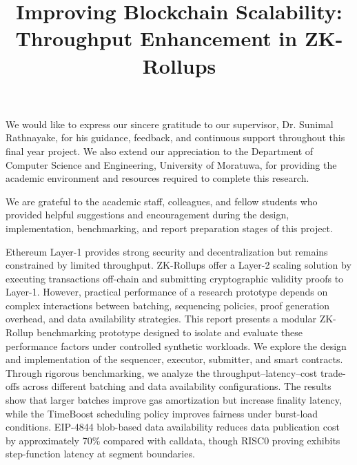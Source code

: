 \documentclass[12pt]{uomthesis}
\begin{document}
\title{Improving Blockchain Scalability: Throughput Enhancement in ZK-Rollups}

\maketitle

We would like to express our sincere gratitude to our supervisor, Dr. Sunimal Rathnayake, for his guidance, feedback, and continuous support throughout this final year project. We also extend our appreciation to the Department of Computer Science and Engineering, University of Moratuwa, for providing the academic environment and resources required to complete this research.

We are grateful to the academic staff, colleagues, and fellow students who provided helpful suggestions and encouragement during the design, implementation, benchmarking, and report preparation stages of this project.

\begin{abstractpage}
Ethereum Layer-1 provides strong security and decentralization but remains constrained by limited throughput. ZK-Rollups offer a Layer-2 scaling solution by executing transactions off-chain and submitting cryptographic validity proofs to Layer-1. However, practical performance of a research prototype depends on complex interactions between batching, sequencing policies, proof generation overhead, and data availability strategies. This report presents a modular ZK-Rollup benchmarking prototype designed to isolate and evaluate these performance factors under controlled synthetic workloads. We explore the design and implementation of the sequencer, executor, submitter, and smart contracts. Through rigorous benchmarking, we analyze the throughput--latency--cost trade-offs across different batching and data availability configurations. The results show that larger batches improve gas amortization but increase finality latency, while the TimeBoost scheduling policy improves fairness under burst-load conditions. EIP-4844 blob-based data availability reduces data publication cost by approximately 70\% compared with calldata, though RISC0 proving exhibits step-function latency at segment boundaries.
\end{abstractpage}
\end{document}
